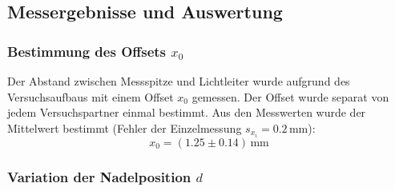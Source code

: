 \subsection{Messergebnisse und Auswertung}
\subsubsection{Bestimmung des Offsets \texorpdfstring{$x_0$}{x0}}
Der Abstand zwischen Messspitze und Lichtleiter wurde aufgrund des Versuchsaufbaus mit einem Offset $x_0$ gemessen. Der Offset wurde separat 
von jedem Versuchspartner einmal bestimmt. Aus den Messwerten wurde der Mittelwert bestimmt (Fehler der Einzelmessung $s_{x_i} = 0.2$\,mm):
\begin{equation}
  x_0 = (1.25 \pm 0.14)\,\text{mm}
\end{equation}
\subsubsection{Variation der Nadelposition \texorpdfstring{$d$}{d}}

